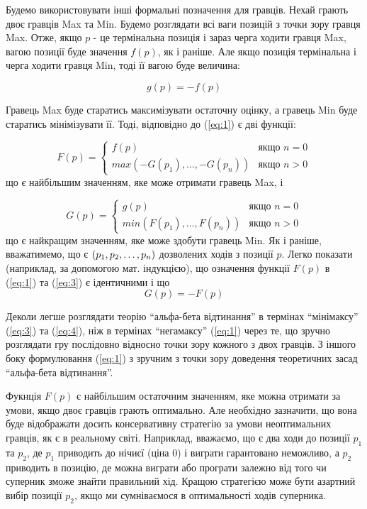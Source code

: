 \documentclass[12pt,a4paper]{article}
\begin{document}
Будемо використовувати інші формальні позначення для гравців. Нехай грають
двоє гравців Max та Min. Будемо розглядати всі ваги позицій з точки зору
гравця Max. Отже, якщо $p$ - це термінальна позиція і зараз черга ходити
гравця Max, вагою позиції буде значення $f(p)$, як і раніше. Але якщо позиція
термінальна і черга ходити гравця Min, тоді її вагою буде величина:

\begin{equation}
  \label{eq:2}
  g(p) = -f(p)
\end{equation}

Гравець Max буде старатись максимізувати остаточну оцінку, а гравець Min буде
старатись мінімізувати її. Тоді, відповідно до (\ref{eq:1}) є дві функції:

\begin{equation}
  \label{eq:3}
  F(p) =
  \begin{cases}
    f(p) & \textit{якщо $n = 0$}\\
    max(-G(p_1),\dots,-G(p_n)) & \textit{якщо $n > 0$}
  \end{cases}
\end{equation}
що є найбільшим значенням, яке може отримати гравець Max, і

\begin{equation}
  \label{eq:4}
  G(p) =
  \begin{cases}
    g(p) & \textit{якщо $n = 0$}\\
    min(F(p_1),\dots,F(p_n)) & \textit{якщо $n > 0$}
  \end{cases}
\end{equation}
що є найкращим значенням, яке може здобути гравець Min. Як і раніше,
вважатимемо, що є $(p_1,p_2,\dots,p_n)$ дозволених ходів з позиції $p$. Легко показати
(наприклад, за допомогою мат. індукцією), що означення функції $F(p)$ в (\ref{eq:1}) та
(\ref{eq:3}) є ідентичними і що
\begin{equation}
  \label{eq:5}
  G(p) = -F(p)
\end{equation}

Деколи легше розглядати теорію ``альфа-бета відтинання'' в термінах
``мінімаксу'' (\ref{eq:3}) та (\ref{eq:4}), ніж в термінах ``негамаксу''
(\ref{eq:1}) через те, що зручно розглядати гру послідовно відносно точки зору
кожного з двох гравців. З іншого боку формулювання (\ref{eq:1}) з зручним з
точки зору доведення теоретичних засад ``альфа-бета відтинання''.

Фукнція $F(p)$ є найбільшим остаточним значенням, яке можна отримати за умови,
якщо двоє гравців грають оптимально. Але необхідно зазначити, що вона буде
відображати досить консервативну стратегію за умови неоптимальних гравців, як
є в реальному світі. Наприклад, вважаємо, що є два ходи до позиції $p_1$ та
$p_2$, де $p_1$ приводить до нічиєї (ціна $0$) і виграти гарантовано
неможливо, а $p_2$ приводить в позицію, де можна виграти або програти залежно
від того чи суперник зможе знайти правильний хід. Кращою стратегією може бути
азартний вибір позиції $p_2$, якщо ми сумніваємося в оптимальності ходів
суперника.
\end{document}
